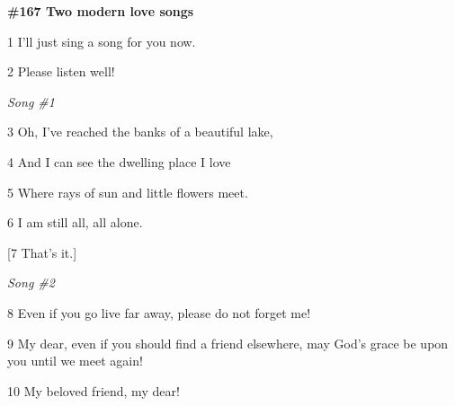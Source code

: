 
\textbf{\#167 Two modern love songs}

1 I'll just sing a song for you now.

2 Please listen well!

\textit{Song \#1}

3 Oh, I've reached the banks of a beautiful lake,

4 And I can see the dwelling place I love

5 Where rays of sun and little flowers meet.

6 I am still all, all alone.

[7 That's it.]

\textit{Song \#2}

8 Even if you go live far away, please do not forget me!

9 My dear, even if you should find a friend elsewhere, may God's grace be upon
you until we meet again!

10 My beloved friend, my dear!


